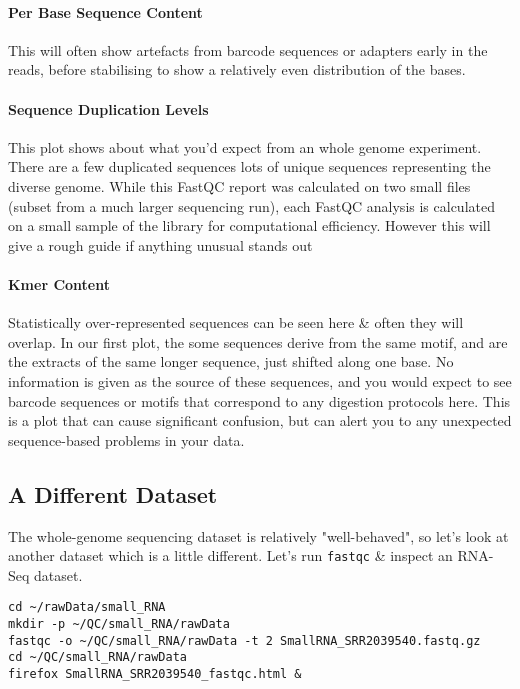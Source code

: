 \paragraph{Per Base Sequence Content}
This will often show artefacts from barcode sequences or adapters early in the reads, before stabilising to show a relatively even distribution of the bases.

\paragraph{Sequence Duplication Levels}
This plot shows about what you'd expect from an whole genome experiment.
There are a few duplicated sequences lots of unique sequences representing the diverse genome.
While this FastQC report was calculated on two small files (subset from a much larger sequencing run), each FastQC analysis is calculated on a small sample of the library for computational efficiency. However this will give a rough guide if anything unusual stands out

\paragraph{Kmer Content}
Statistically over-represented sequences can be seen here \& often they will overlap.
In our first plot, the some sequences derive from the same motif, and are the extracts of the same longer sequence, just shifted along one base.
No information is given as the source of these sequences, and you would expect to see barcode sequences or motifs that correspond to any digestion protocols here.
This is a plot that can cause significant confusion, but can alert you to any unexpected sequence-based problems in your data.

\subsection{A Different Dataset}
The whole-genome sequencing dataset is relatively "well-behaved", so let's look at another dataset which is a little different.
Let's run \texttt{fastqc} \& inspect an RNA-Seq dataset.

\begin{lstlisting}
cd ~/rawData/small_RNA
mkdir -p ~/QC/small_RNA/rawData
fastqc -o ~/QC/small_RNA/rawData -t 2 SmallRNA_SRR2039540.fastq.gz
cd ~/QC/small_RNA/rawData
firefox SmallRNA_SRR2039540_fastqc.html &
\end{lstlisting}

